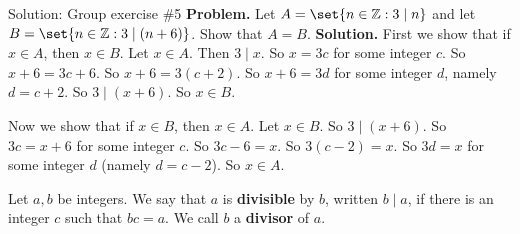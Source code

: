 \documentclass[10pt]{beamer}
\begin{document}
\begin{frame}{Solution: Group exercise \#5}
\textbf{Problem.}   Let $A = \set{n \in \mathbb{Z} : 3 \mid n}$ and let $B = \set{n \in \mathbb{Z} : 3 \mid (n+6)}$. Show that $A=B$. 
\vfill
\textbf{Solution.} First we show that if $x \in A$, then $x \in B$. Let $x \in A$.  Then $3 \mid x$.   So $x=3c$ for some integer $c$. So $x+6=3c+6$. So $x+6=3(c+2)$. So $x+6=3d$ for some integer $d$, namely $d=c+2$.   So $3 \mid (x+6)$. So $x \in B$.

Now we show that if $x \in B$, then $x \in A$. Let $x \in B$. So $3 \mid (x+6)$.  So $3c=x+6$ for some integer $c$.   So $3c-6=x$. So $3(c-2)=x$.  So $3d=x$ for some integer $d$ (namely $d=c-2$).   So $x \in A$. 
\vfill
\begin{mygreenbox}[title={Reference: Definition}]
Let $a,b$ be integers.  We say that $a$ is \textbf{divisible} by $b$, written $b \mid a$, if there is an integer $c$ such that $bc=a$. We call $b$ a \textbf{divisor} of $a$.	
\end{mygreenbox}

\end{frame}
\end{document}
